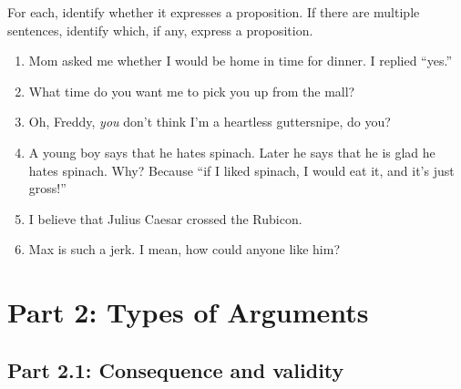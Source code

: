 \problempart
\label{pr.IDprops}
For each, identify whether it expresses a proposition. If there are multiple sentences, identify which, if any, express a proposition.
\begin{enumerate}
\item Mom asked me whether I would be home in time for dinner. I replied ``yes.''
\item What time do you want me to pick you up from the mall? 
\item Oh, Freddy, \emph{you} don't think I'm a heartless guttersnipe, do you?
\item A young boy says that he hates spinach. Later he says that he is glad he hates spinach. Why? Because ``if I liked spinach, I would eat it, and it's just gross!''
\item I believe that Julius Caesar crossed the Rubicon.
\item Max is such a jerk. I mean, how could anyone like him? 
\end{enumerate}


\chapter{Part 2: Types of Arguments}
\label{s:Valid}

\section{Part 2.1: Consequence and validity}

